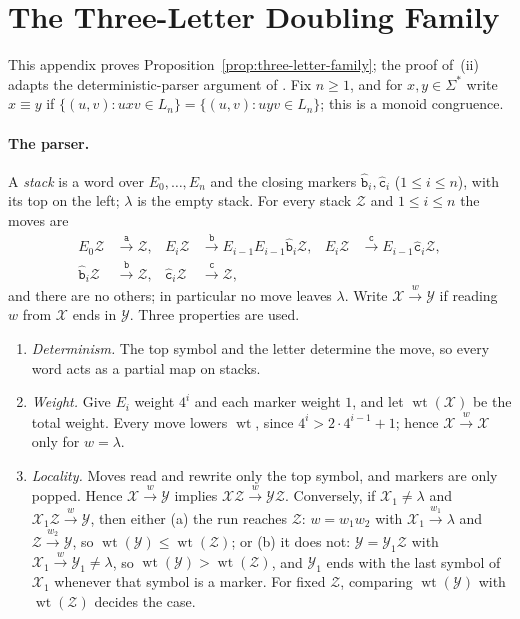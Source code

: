 \documentclass[11pt]{article}
\numberwithin{equation}{section}
\theoremstyle{plain}
\theoremstyle{definition}
\theoremstyle{remark}
\theoremstyle{plain}
\newcommand{\eps}{\lambda}
\begin{document}
\section{The Three-Letter Doubling Family}
\label{app:three-letter}
This appendix proves Proposition~\ref{prop:three-letter-family}; the proof of~(ii)
adapts the deterministic-parser argument of \cite[Appendix~C]{kuriyamaCFG}.  Fix
$n\ge1$, and for $x,y\in\Sigma^*$ write $x\equiv y$ if
$\{(u,v):uxv\in L_n\}=\{(u,v):uyv\in L_n\}$; this is a monoid congruence.

\paragraph{The parser.}
A \emph{stack} is a word over $E_0,\ldots,E_n$ and the closing markers
$\hat{\mathtt b}_i,\hat{\mathtt c}_i$ ($1\le i\le n$), with its top on the left; $\eps$
is the empty stack.  For every stack $\mathcal Z$ and $1\le i\le n$ the moves are
\[
\begin{aligned}
E_0\mathcal Z&\xrightarrow{\mathtt a}\mathcal Z,&
E_i\mathcal Z&\xrightarrow{\mathtt b}E_{i-1}E_{i-1}\hat{\mathtt b}_i\mathcal Z,&
E_i\mathcal Z&\xrightarrow{\mathtt c}E_{i-1}\hat{\mathtt c}_i\mathcal Z,\\
\hat{\mathtt b}_i\mathcal Z&\xrightarrow{\mathtt b}\mathcal Z,&
\hat{\mathtt c}_i\mathcal Z&\xrightarrow{\mathtt c}\mathcal Z,
\end{aligned}
\]
and there are no others; in particular no move leaves $\eps$.  Write
$\mathcal X\xrightarrow{w}\mathcal Y$ if reading $w$ from $\mathcal X$ ends in
$\mathcal Y$.  Three properties are used.
\begin{enumerate}[label=\textup{(D\arabic*)},leftmargin=2.6em]
\item \emph{Determinism.} The top symbol and the letter determine the move, so
every word acts as a partial map on stacks.
\item \emph{Weight.} Give $E_i$ weight $4^i$ and each marker weight $1$, and let
$\operatorname{wt}(\mathcal X)$ be the total weight.  Every move lowers
$\operatorname{wt}$, since $4^i>2\cdot4^{i-1}+1$; hence
$\mathcal X\xrightarrow{w}\mathcal X$ only for $w=\eps$.
\item \emph{Locality.} Moves read and rewrite only the top symbol, and markers
are only popped.  Hence $\mathcal X\xrightarrow{w}\mathcal Y$ implies
$\mathcal X\mathcal Z\xrightarrow{w}\mathcal Y\mathcal Z$.  Conversely, if
$\mathcal X_1\ne\eps$ and $\mathcal X_1\mathcal Z\xrightarrow{w}\mathcal Y$, then either
\textup{(a)} the run reaches $\mathcal Z$: $w=w_1w_2$ with
$\mathcal X_1\xrightarrow{w_1}\eps$ and $\mathcal Z\xrightarrow{w_2}\mathcal Y$, so
$\operatorname{wt}(\mathcal Y)\le\operatorname{wt}(\mathcal Z)$; or \textup{(b)} it
does not: $\mathcal Y=\mathcal Y_1\mathcal Z$ with $\mathcal X_1\xrightarrow{w}\mathcal Y_1\ne\eps$,
so $\operatorname{wt}(\mathcal Y)>\operatorname{wt}(\mathcal Z)$, and $\mathcal Y_1$ ends
with the last symbol of $\mathcal X_1$ whenever that symbol is a marker.  For
fixed $\mathcal Z$, comparing $\operatorname{wt}(\mathcal Y)$ with
$\operatorname{wt}(\mathcal Z)$ decides the case.
\end{enumerate}
\end{document}
